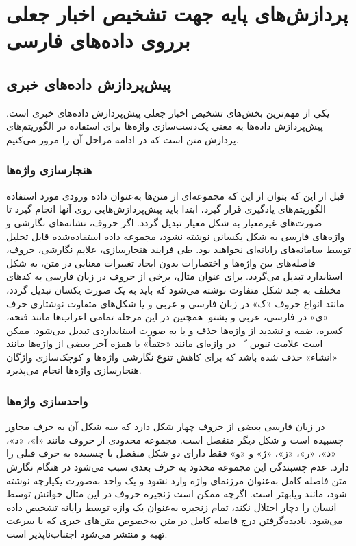 \chapter{پردازش‌های پایه جهت تشخیص اخبار جعلی برروی داده‌های فارسی}
\section{پیش‌پردازش داده‌های خبری}
یکی از مهم‌ترین بخش‌های تشخیص اخبار جعلی پیش‌پردازش داده‌های خبری است. پیش‌پردازش داده‌ها به معنی یک‌دست‌سازی واژه‌ها برای استفاده در الگوریتم‌های پردازش متن است که در ادامه مراحل آن را مرور می‌کنیم.
 

\subsection[هنجارسازی واژه‌ها]{هنجارسازی واژه‌ها}
قبل از این که بتوان از این که مجموعه‌ای از متن‌ها به‌عنوان داده ورودی مورد استفاده الگوریتم‌های یادگیری قرار گیرد،  ابتدا باید پیش‌پردازش‌هایی روی آنها انجام گیرد تا صورت‌های غیرمعیار به شکل معیار تبدیل گردد. اگر حروف، نشانه‌های نگارشی و واژه‌های فارسی به شکل یکسانی نوشته نشود، مجموعه داده استفاده‌شده قابل تحلیل توسط سامانه‌های رایانه‌ای نخواهند بود. طی فرایند هنجارسازی، علایم نگارشی، حروف، فاصله‌های بین واژه‌ها و اختصارات  بدون ایجاد تغییرات معنایی در متن، به شکل استاندارد تبدیل می‌گردد. برای عنوان مثال، برخی از حروف در زبان فارسی به کدهای مختلف به چند شکل متفاوت نوشته می‌شود که باید به یک صورت یکسان تبدیل گردد، مانند انواع حروف «ک» در زبان فارسی و عربی و یا شکل‌های متفاوت نوشتاری حرف «ی» در فارسی، عربی و پشتو. همچنین در این مرحله تمامی اعراب‌ها مانند فتحه، کسره، ضمه  و تشدید از واژه‌ها حذف و یا به صورت استانداردی تبدیل می‌شود. ممکن است  علامت تنوین  ~ً~ در واژه‌ای مانند «حتماً» یا همزه آخر بعضی از واژه‌ها مانند «انشاء» حذف  شده باشد که برای کاهش تنوع نگارشی واژه‌ها و کوچک‌‌سازی واژگان هنجارسازی واژه‌ها انجام می‌پذیرد.


\subsection[واحدسازی واژه‌ها]{واحدسازی واژه‌ها}
در زبان فارسی بعضی از حروف چهار شکل دارد که سه شکل آن به حرف مجاور چسبیده است و شکل دیگر منفصل است. مجموعه محدودی از حروف مانند «ا»، «د»، «ذ»، «ر»، «ز»، «ژ» و «و» فقط دارای دو شکل منفصل یا چسبیده به حرف قبلی را دارد. عدم چسبندگی این مجموعه محدود به حرف بعدی سبب می‌شود در هنگام نگارش  متن فاصله کامل به‌عنوان مرزنمای واژه وارد نشود و یک واحد به‌صورت یکپارچه نوشته شود، مانند ویابهتر است. اگرچه ممکن است زنجیره حروف در این مثال خوانش توسط انسان را دچار اختلال نکند، تمام زنجیره به‌عنوان یک واژه توسط رایانه تشخیص داده می‌شود.  نادیده‌گرفتن درج فاصله کامل در متن به‌خصوص متن‌های خبری که با سرعت تهیه و منتشر می‌شود اجتناب‌ناپذیر است.

